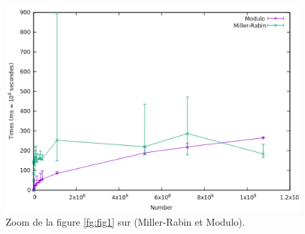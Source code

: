 \begin{frame}
	\begin{figure}[!ht]	
		\begin{center}\includegraphics[scale=0.5]{Zoom3.png}\end{center}
		\caption{Zoom de la figure \ref{fg:fig1} sur (Miller-Rabin et Modulo).}
		\label{fg:fig4}
	\end{figure}
\end{frame}
	
